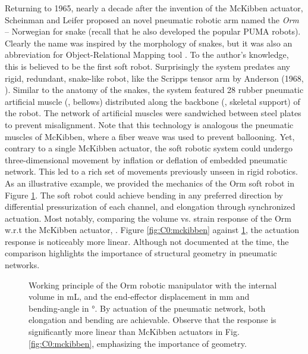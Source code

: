 Returning to 1965, nearly a decade after the invention of the McKibben actuator, Scheinman and Leifer proposed an {novel} pneumatic robotic arm named the \emph{Orm} -- Norwegian for snake (recall that he also developed the popular PUMA robots). Clearly the name was inspired by the morphology of snakes, but it was also an abbreviation for Object-Relational Mapping tool \cite{Corke2020}. To the author's knowledge, this is believed to be the first soft robot. Surprisingly the system predates any rigid, redundant, snake-like robot, like the Scripps tensor arm by Anderson (1968, \cite{Anderson1968}). Similar to the anatomy of the snakes, the system featured 28 rubber pneumatic artificial muscle (\ie, bellows) distributed along the backbone (\ie, skeletal support) of the robot. The network of artificial muscles were sandwiched between steel plates to prevent misalignment. Note that this technology is analogous the pneumatic muscles of McKibben, where a fiber weave was used to prevent ballooning. Yet, contrary to a single McKibben actuator, the soft robotic system could undergo three-dimensional movement by inflation or deflation of embedded pneumatic network. This led to a rich set of movements previously unseen in rigid robotics. As an illustrative example, we provided the mechanics of the Orm soft robot in Figure \ref{fig:C0:ormrobot}. The soft robot could achieve bending in any preferred direction by differential pressurization of each channel, and elongation through synchronized actuation. Most notably, comparing the volume vs. strain response of the Orm w.r.t the McKibben actuator, \ie. Figure \ref{fig:C0:mckibben} against \ref{fig:C0:ormrobot}, the actuation response is noticeably more linear. Although not documented at the time, the comparison highlights the importance of structural geometry in pneumatic networks.

\begin{figure}[!t]
  \ifx\printFigures\undefined
  \else
  \centering
  
  
  \fi
  \vspace{-6mm}
  \caption{Working principle of the Orm robotic manipulator with the internal volume  in \si{\milli \liter}, and the end-effector displacement  in \si{\milli \meter} and bending-angle  in \si{\degree}. By actuation of the pneumatic network, both elongation and bending are achievable. Observe that the response is significantly more linear than McKibben actuators in Fig. \ref{fig:C0:mckibben}, emphasizing the importance of geometry.
  \vspace{-6mm}
  \label{fig:C0:ormrobot}}
\end{figure}

